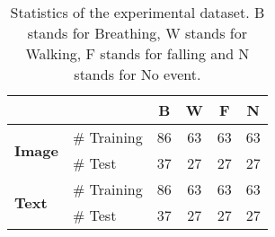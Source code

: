 
\begin{table}[ht]
    \centering
    \small
    \renewcommand{\arraystretch}{1.1} %
    \setlength{\tabcolsep}{6pt} %
    \begin{tabular}{llcccc}
        \toprule
        \multicolumn{2}{l}{\textbf{}} & \textbf{B} & \textbf{W} & \textbf{F} & \textbf{N} \\ 
        \midrule
        \multirow{2}{*}{\textbf{Image}} & \# Training & 86 & 63 & 63 & 63 \\
                                         & \# Test     & 37 & 27 & 27 & 27 \\ 
        \midrule
        \multirow{2}{*}{\textbf{Text}}  & \# Training & 86 & 63 & 63 & 63 \\
                                         & \# Test     & 37 & 27 & 27 & 27 \\ 
        \bottomrule
    \end{tabular}
    \caption{Statistics of the experimental dataset. B stands for Breathing, W stands for Walking, F stands for falling and N stands for No event.}
        \label{tab:data_stats}
\end{table}
